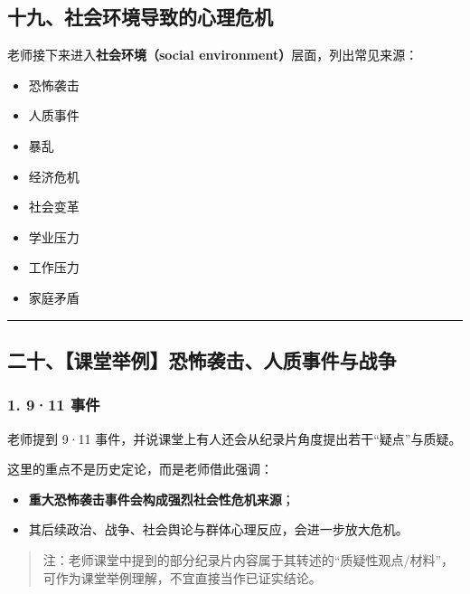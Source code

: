 \documentclass[
  chinese,
  9pt,
  a4paper,
]{ctexart}
\providecommand{\tightlist}{%
  \setlength{\itemsep}{0pt}\setlength{\parskip}{0pt}}
\begin{document}
\subsection{十九、社会环境导致的心理危机}\label{ux5341ux4e5dux793eux4f1aux73afux5883ux5bfcux81f4ux7684ux5fc3ux7406ux5371ux673a}

老师接下来进入\textbf{社会环境（social
environment）}层面，列出常见来源：

\begin{itemize}
\tightlist
\item
  恐怖袭击
\item
  人质事件
\item
  暴乱
\item
  经济危机
\item
  社会变革
\item
  学业压力
\item
  工作压力
\item
  家庭矛盾
\end{itemize}

\begin{center}\rule{0.5\linewidth}{0.5pt}\end{center}

\subsection{二十、【课堂举例】恐怖袭击、人质事件与战争}\label{ux4e8cux5341ux8bfeux5802ux4e3eux4f8bux6050ux6016ux88adux51fbux4ebaux8d28ux4e8bux4ef6ux4e0eux6218ux4e89}

\subsubsection{1. 9·11 事件}\label{ux4e8bux4ef6}

老师提到 9·11
事件，并说课堂上有人还会从纪录片角度提出若干``疑点''与质疑。

这里的重点不是历史定论，而是老师借此强调：

\begin{itemize}
\tightlist
\item
  \textbf{重大恐怖袭击事件会构成强烈社会性危机来源}；
\item
  其后续政治、战争、社会舆论与群体心理反应，会进一步放大危机。
\end{itemize}

\begin{quote}
注：老师课堂中提到的部分纪录片内容属于其转述的``质疑性观点/材料''，可作为课堂举例理解，不宜直接当作已证实结论。
\end{quote}
\end{document}
